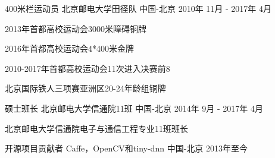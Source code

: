 


\begin{cventries}


\cventry
{400米栏运动员} %
{北京邮电大学田径队} %
{中国-北京} %
{2010年 11月 - 2017年 4月} %
{ %
\begin{cvitems}
\item {2013年首都高校运动会3000米障碍铜牌}
\item {2016年首都高校运动会4*400米金牌}
\item {2010-2017年首都高校运动会11次进入决赛前8}
\item {北京国际铁人三项赛亚洲区20-24年龄组铜牌}
\end{cvitems}
}

\cventry
{硕士班长} %
{北京邮电大学信通院11班} %
{中国-北京} %
{2014年 9月 - 2017年 4月} %
{ %
\begin{cvitems}
\item {北京邮电大学信通院电子与通信工程专业11班班长}
\end{cvitems}
}

\cventry
{开源项目贡献者} %
{Caffe，OpenCV和tiny-dnn} %
{中国-北京} %
{2013年至今} %
{ %
}


\end{cventries}
